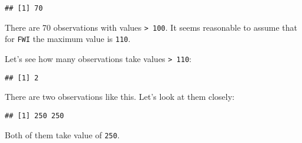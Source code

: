 \documentclass[]{article}
\newenvironment{Shaded}{\begin{snugshade}}{\end{snugshade}}
\newcommand{\CharTok}[1]{\textcolor[rgb]{0.31,0.60,0.02}{#1}}
\newcommand{\ControlFlowTok}[1]{\textcolor[rgb]{0.13,0.29,0.53}{\textbf{#1}}}
\newcommand{\DataTypeTok}[1]{\textcolor[rgb]{0.13,0.29,0.53}{#1}}
\newcommand{\DecValTok}[1]{\textcolor[rgb]{0.00,0.00,0.81}{#1}}
\newcommand{\KeywordTok}[1]{\textcolor[rgb]{0.13,0.29,0.53}{\textbf{#1}}}
\newcommand{\NormalTok}[1]{#1}
\newcommand{\OperatorTok}[1]{\textcolor[rgb]{0.81,0.36,0.00}{\textbf{#1}}}
\newcommand{\StringTok}[1]{\textcolor[rgb]{0.31,0.60,0.02}{#1}}
\begin{document}
\begin{Shaded}
\end{Shaded}

\begin{verbatim}
## [1] 70
\end{verbatim}

There are 70 observations with values \texttt{\textgreater{}\ 100}. It
seems reasonable to assume that for \texttt{FWI} the maximum value is
\texttt{110}.

Let's see how many observations take values
\texttt{\textgreater{}\ 110}:

\begin{Shaded}
\end{Shaded}

\begin{verbatim}
## [1] 2
\end{verbatim}

There are two observations like this. Let's look at them closely:

\begin{Shaded}
\end{Shaded}

\begin{verbatim}
## [1] 250 250
\end{verbatim}

Both of them take value of \texttt{250}.

\begin{Shaded}
\end{Shaded}
\end{document}
